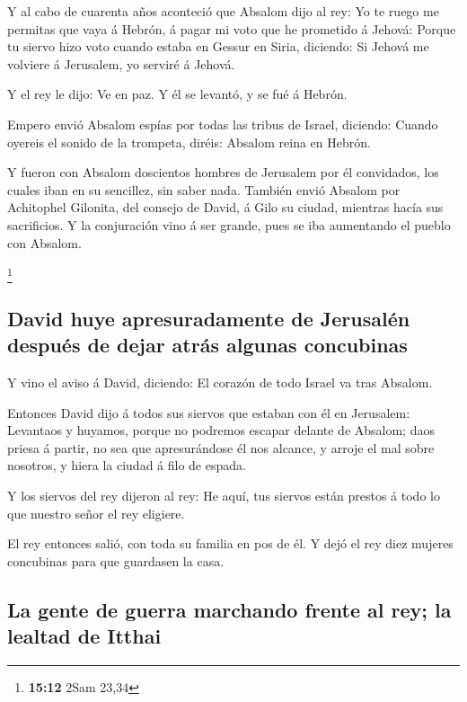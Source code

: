  Y al cabo de cuarenta años aconteció que Absalom dijo al
rey: Yo te ruego me permitas que vaya á Hebrón, á pagar mi voto que he
prometido á Jehová:  Porque tu siervo hizo voto cuando
estaba en Gessur en Siria, diciendo: Si Jehová me volviere á Jerusalem,
yo serviré á Jehová.

 Y el rey le dijo: Ve en paz. Y él se levantó, y se fué á
Hebrón.

 Empero envió Absalom espías por todas las tribus de
Israel, diciendo: Cuando oyereis el sonido de la trompeta, diréis:
Absalom reina en Hebrón.

 Y fueron con Absalom doscientos hombres de Jerusalem por
él convidados, los cuales iban en su sencillez, sin saber nada.
 También envió Absalom por Achitophel Gilonita, del
consejo de David, á Gilo su ciudad, mientras hacía sus sacrificios. Y la
conjuración vino á ser grande, pues se iba aumentando el pueblo con
Absalom.

\footnote{\textbf{15:12} 2Sam 23,34}

\hypertarget{david-huye-apresuradamente-de-jerusaluxe9n-despuuxe9s-de-dejar-atruxe1s-algunas-concubinas}{%
\subsection{David huye apresuradamente de Jerusalén después de dejar
atrás algunas
concubinas}\label{david-huye-apresuradamente-de-jerusaluxe9n-despuuxe9s-de-dejar-atruxe1s-algunas-concubinas}}

 Y vino el aviso á David, diciendo: El corazón de todo
Israel va tras Absalom.

 Entonces David dijo á todos sus siervos que estaban con
él en Jerusalem: Levantaos y huyamos, porque no podremos escapar delante
de Absalom; daos priesa á partir, no sea que apresurándose él nos
alcance, y arroje el mal sobre nosotros, y hiera la ciudad á filo de
espada.

 Y los siervos del rey dijeron al rey: He aquí, tus
siervos están prestos á todo lo que nuestro señor el rey eligiere.

 El rey entonces salió, con toda su familia en pos de él.
Y dejó el rey diez mujeres concubinas para que guardasen la casa.

\hypertarget{la-gente-de-guerra-marchando-frente-al-rey-la-lealtad-de-itthai}{%
\subsection{La gente de guerra marchando frente al rey; la lealtad de
Itthai}\label{la-gente-de-guerra-marchando-frente-al-rey-la-lealtad-de-itthai}}

